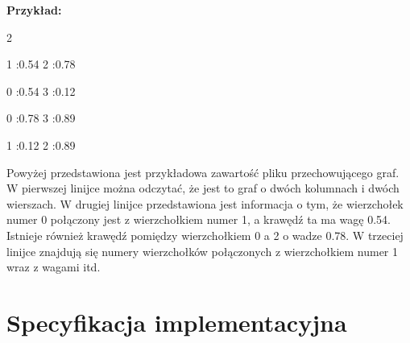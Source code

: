 \documentclass[11pt,a4paper]{report}
\newenvironment{multiconsole}{\begingroup\fontfamily{qcr}\selectfont}{\endgroup}
\begin{document}
    \vspace{1em}

    \noindent
    \textbf{Przykład:}

    \begin{multiconsole}
        2 2

        \hspace*{2em}1 :0.54  2 :0.78

        \hspace*{2em}0 :0.54  3 :0.12

        \hspace*{2em}0 :0.78  3 :0.89

        \hspace*{2em}1 :0.12  2 :0.89
    \end{multiconsole}

    Powyżej przedstawiona jest przykładowa zawartość pliku przechowującego graf. W pierwszej linijce można odczytać, że jest to graf o dwóch kolumnach i dwóch wierszach. W drugiej linijce przedstawiona jest informacja o tym, że wierzchołek numer 0 połączony jest z wierzchołkiem numer 1, a krawędź ta ma wagę 0.54. Istnieje również krawędź pomiędzy wierzchołkiem 0 a 2 o wadze 0.78. W trzeciej linijce znajdują się numery wierzchołków połączonych z wierzchołkiem numer 1 wraz z wagami itd.





    \newpage
    \chapter{Specyfikacja implementacyjna}




    \newpage
\end{document}
